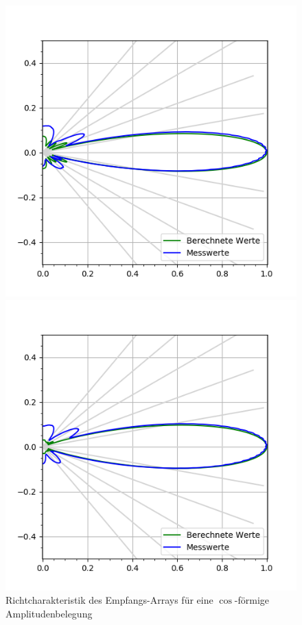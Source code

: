 \begin{figure}[htb]
\begin{minipage}{0.5\textwidth}
\includegraphics[width=\textwidth]{graphics/plot_test_characteristic_receiver_0_deg_send_rect_receive_cos_4_bursts.png}
\caption{Richtcharakteristik des Empfangs-Arrays für eine $\cos$-förmige Amplitudenbelegung} %
\label{fig:plot_test_characteristic_receiver_0_deg_send_rect_receive_cos_4_bursts}
%
\end{minipage}
\begin{minipage}{0.5\textwidth}
\includegraphics[width=\textwidth]{graphics/plot_test_characteristic_receiver_0_deg_send_rect_receive_cos2_4_bursts.png}

\end{minipage}
\end{figure}
